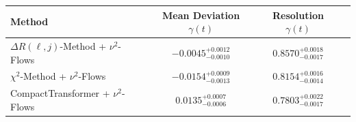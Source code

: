     \begin{tabular}{lccc}
        \toprule
        Method & Mean Deviation $\gamma(t)$ & Resolution $\gamma(t)$ \\
        \midrule
        $\Delta R(\ell,j)$-Method + $\nu^2$-Flows & $-0.0045^{+0.0012}_{-0.0010}$ & $0.8570^{+0.0018}_{-0.0017}$ \\
        $\chi^2$-Method + $\nu^2$-Flows & $-0.0154^{+0.0009}_{-0.0013}$ & $0.8154^{+0.0016}_{-0.0014}$ \\
        CompactTransformer + $\nu^2$-Flows & $0.0135^{+0.0007}_{-0.0006}$ & $0.7803^{+0.0022}_{-0.0017}$ \\
        \bottomrule
    \end{tabular}